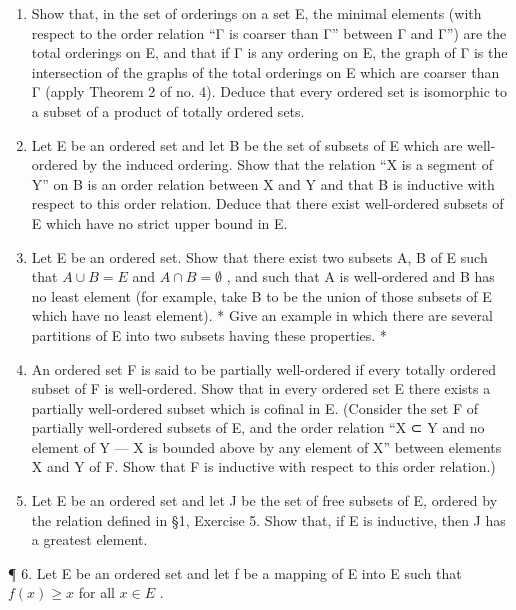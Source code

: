 \begin{enumerate}
\def\labelenumi{\arabic{enumi}.}
\item
  Show that, in the set of orderings on a set E, the minimal elements (with respect to the order relation ``Γ is coarser than Γ'' between Γ and Γ'') are the total orderings on E, and that if Γ is any ordering on E, the graph of Γ is the intersection of the graphs of the total orderings on E which are coarser than Γ (apply Theorem 2 of no. 4). Deduce that every ordered set is isomorphic to a subset of a product of totally ordered sets.
\item
  Let E be an ordered set and let B be the set of subsets of E which are well-ordered by the induced ordering. Show that the relation ``X is a segment of Y'' on B is an order relation between X and Y and that B is inductive with respect to this order relation. Deduce that there exist well-ordered subsets of E which have no strict upper bound in E.
\item
  Let E be an ordered set. Show that there exist two subsets A, B of E such that \(A \cup B = E\) and \(A \cap B = \emptyset\) , and such that A is well-ordered and B has no least element (for example, take B to be the union of those subsets of E which have no least element). * Give an example in which there are several partitions of E into two subsets having these properties. *
\item
  An ordered set F is said to be partially well-ordered if every totally ordered subset of F is well-ordered. Show that in every ordered set E there exists a partially well-ordered subset which is cofinal in E. (Consider the set F of partially well-ordered subsets of E, and the order relation ``X ⊂ Y and no element of Y --- X is bounded above by any element of X'' between elements X and Y of F. Show that F is inductive with respect to this order relation.)
\item
  Let E be an ordered set and let J be the set of free subsets of E, ordered by the relation defined in §1, Exercise 5. Show that, if E is inductive, then J has a greatest element.
\end{enumerate}

¶ 6. Let E be an ordered set and let f be a mapping of E into E such that \(f(x) \geqslant x\) for all \(x \in E\) .


